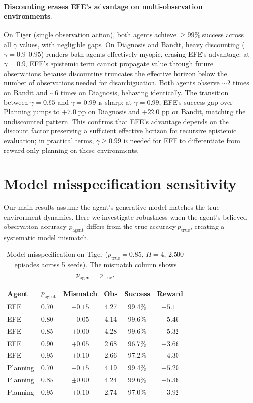 \documentclass[runningheads]{llncs}
\begin{document}
\paragraph{Discounting erases EFE's advantage on multi-observation environments.} On Tiger (single observation action), both agents achieve ${\geq}99\%$ success across all $\gamma$ values, with negligible gaps. On Diagnosis and Bandit, heavy discounting ($\gamma{=}0.9$--$0.95$) renders both agents effectively myopic, erasing EFE's advantage: at $\gamma{=}0.9$, EFE's epistemic term cannot propagate value through future observations because discounting truncates the effective horizon below the number of observations needed for disambiguation. Both agents observe ${\sim}2$ times on Bandit and ${\sim}6$ times on Diagnosis, behaving identically. The transition between $\gamma{=}0.95$ and $\gamma{=}0.99$ is sharp: at $\gamma{=}0.99$, EFE's success gap over Planning jumps to $+7.0$ pp on Diagnosis and $+22.0$ pp on Bandit, matching the undiscounted pattern. This confirms that EFE's advantage depends on the discount factor preserving a sufficient effective horizon for recursive epistemic evaluation; in practical terms, $\gamma \geq 0.99$ is needed for EFE to differentiate from reward-only planning on these environments.

\section{Model misspecification sensitivity}
\label{app:misspec}

Our main results assume the agent's generative model matches the true environment dynamics. Here we investigate robustness when the agent's believed observation accuracy $p_{\text{agent}}$ differs from the true accuracy $p_{\text{true}}$, creating a systematic model mismatch.

\begin{table}[h]
\centering
\caption{Model misspecification on Tiger ($p_{\text{true}}{=}0.85$, $H{=}4$, 2{,}500 episodes across 5 seeds). The mismatch column shows $p_{\text{agent}} - p_{\text{true}}$.}
\label{tab:misspec-tiger}
\begin{small}
\begin{tabular}{llcccc}
\toprule
Agent & $p_{\text{agent}}$ & Mismatch & Obs & Success & Reward \\
\midrule
EFE & 0.70 & $-0.15$ & 4.27 & 99.4\% & $+5.11$ \\
EFE & 0.80 & $-0.05$ & 4.14 & 99.6\% & $+5.46$ \\
EFE & 0.85 & $\pm 0.00$ & 4.28 & 99.6\% & $+5.32$ \\
EFE & 0.90 & $+0.05$ & 2.68 & 96.7\% & $+3.66$ \\
EFE & 0.95 & $+0.10$ & 2.66 & 97.2\% & $+4.30$ \\
\midrule
Planning & 0.70 & $-0.15$ & 4.19 & 99.4\% & $+5.20$ \\
Planning & 0.85 & $\pm 0.00$ & 4.24 & 99.6\% & $+5.36$ \\
Planning & 0.95 & $+0.10$ & 2.74 & 97.0\% & $+3.92$ \\
\bottomrule
\end{tabular}
\end{small}
\end{table}
\end{document}
